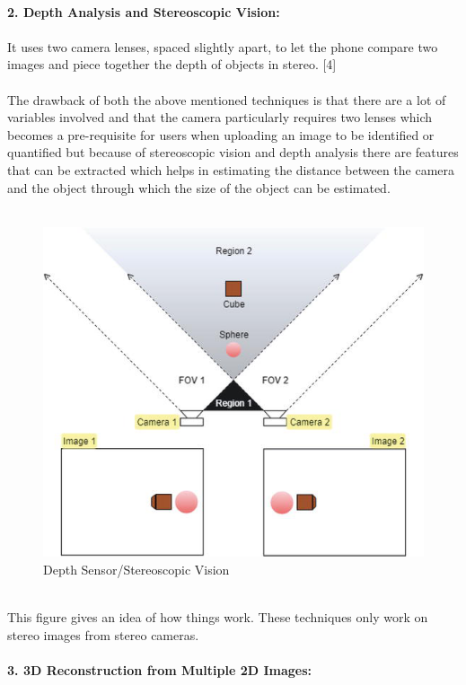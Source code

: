 \\
\textbf{2. Depth Analysis and Stereoscopic Vision:}\\
\\
It uses two camera lenses, spaced slightly apart, to let the phone compare two images and piece together the depth of objects in stereo. [4]\\
\\
The drawback of both the above mentioned techniques is that there are a lot of variables involved and that the camera particularly requires two lenses which becomes a pre-requisite for users when uploading an image to be identified or quantified but because of stereoscopic vision and depth analysis there are features that can be extracted which helps in estimating the distance between the camera and the object through which the size of the object can be estimated. \\
\\
\begin{figure}[!hb]
   \centering
   \includegraphics[scale=0.8]{images/q3.png}
   \caption{Depth Sensor/Stereoscopic Vision}\label{fig:picture}
\end{figure}
\\
This figure gives an idea of how things work. These techniques only work on stereo images from stereo cameras.\\
\\
\textbf{3. 3D Reconstruction from Multiple 2D Images:}\\
\\
